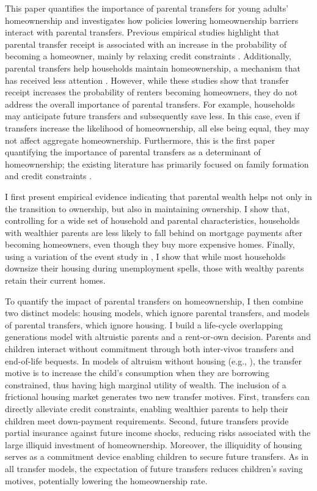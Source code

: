 \documentclass[12pt]{article}
\begin{document}
This paper quantifies the importance of parental transfers for young adults' homeownership and investigates how policies lowering homeownership barriers interact with parental transfers. Previous empirical studies highlight that parental transfer receipt is associated with an increase in the probability of becoming a homeowner, mainly by relaxing credit constraints \citep[see e.g.,][]{Lee2018,Blickle2019,wold2024housing}. Additionally, parental transfers help households maintain homeownership, a mechanism that has received less attention \citep[see e.g.,][]{bond2021role}. However, while these studies show that transfer receipt increases the probability of renters becoming homeowners, they do not address the overall importance of parental transfers. For example, households may anticipate future transfers and subsequently save less. In this case, even if transfers increase the likelihood of homeownership, all else being equal, they may not affect aggregate homeownership. Furthermore, this is the first paper quantifying the importance of parental transfers as a determinant of homeownership; the existing literature has primarily focused on family formation and credit constraints \citep[see e.g.,][]{Chang2024,Paz-Pardo2019,Mabille2020}.

I first present empirical evidence indicating that parental wealth helps not only in the transition to ownership, but also in maintaining ownership. I show that, controlling for a wide set of household and parental characteristics, households with wealthier parents are less likely to fall behind on mortgage payments after becoming homeowners, even though they buy more expensive homes. Finally, using a variation of the event study in \cite{Chetty2007}, I show that while most households downsize their housing during unemployment spells, those with wealthy parents retain their current homes.

To quantify the impact of parental transfers on homeownership, I then combine two distinct models: housing models, which ignore parental transfers, and models of parental transfers, which ignore housing. I build a life-cycle overlapping generations model with altruistic parents and a rent-or-own decision. Parents and children interact without commitment through both inter-vivos transfers and end-of-life bequests. In models of altruism without housing (e.g., \citealp{Altonji1997a,Barczyk2014}), the transfer motive is to increase the child's consumption when they are borrowing constrained, thus having high marginal utility of wealth. The inclusion of a frictional housing market generates two new transfer motives. First, transfers can directly alleviate credit constraints, enabling wealthier parents to help their children meet down-payment requirements. Second, future transfers provide partial insurance against future income shocks, reducing risks associated with the large illiquid investment of homeownership. Moreover, the illiquidity of housing serves as a commitment device enabling children to secure future transfers. As in all transfer models, the expectation of future transfers reduces children's saving motives, potentially lowering the homeownership rate.
\end{document}
